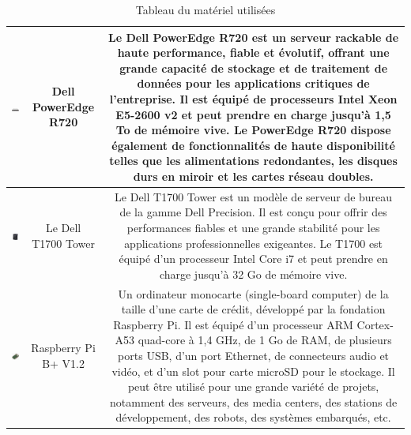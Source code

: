 \begin{table}[H]
\begin{center}
\begin{tabular}{|c{3cm}|c{3cm}|c{10cm}|}
\hline
\includegraphics[width=3cm]{Images/dellr720.jpg} & Dell PowerEdge R720 & Le Dell PowerEdge R720 est un serveur rackable de haute performance, fiable et évolutif, offrant une grande capacité de stockage et de traitement de données pour les applications critiques de l'entreprise. Il est équipé de processeurs Intel Xeon E5-2600 v2 et peut prendre en charge jusqu'à 1,5 To de mémoire vive. Le PowerEdge R720 dispose également de fonctionnalités de haute disponibilité telles que les alimentations redondantes, les disques durs en miroir et les cartes réseau doubles. \\
\hline
\includegraphics[width=3cm]{Images/1700Dell.jpg} & Le Dell T1700 Tower & Le Dell T1700 Tower est un modèle de serveur de bureau de la gamme Dell Precision. Il est conçu pour offrir des performances fiables et une grande stabilité pour les applications professionnelles exigeantes. Le T1700 est équipé d'un processeur Intel Core i7 et peut prendre en charge jusqu'à 32 Go de mémoire vive. \\
\hline
\includegraphics[width=3cm]{Images/RaspberryPi3.jpg} & Raspberry Pi B+ V1.2 & Un ordinateur monocarte (single-board computer) de la taille d'une carte de crédit, développé par la fondation Raspberry Pi. Il est équipé d'un processeur ARM Cortex-A53 quad-core à 1,4 GHz, de 1 Go de RAM, de plusieurs ports USB, d'un port Ethernet, de connecteurs audio et vidéo, et d'un slot pour carte microSD pour le stockage. Il peut être utilisé pour une grande variété de projets, notamment des serveurs, des media centers, des stations de développement, des robots, des systèmes embarqués, etc. \\
\hline
\end{tabular}
\caption{Tableau du matériel utilisées}
\label{1}
\end{center}
\end{table}



